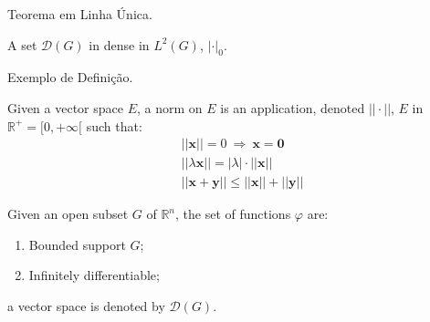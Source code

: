             Teorema em Linha Única.
            \begin{theorem}
                A set $\mathcal{D}(G)$ in dense in $L^2(G)$, $|\cdot|_0$. 
            \end{theorem}




    Exemplo de Definição.
    \begin{definition}
        Given a vector space $E$, a norm on $E$ is an application, denoted $||\cdot||$, $E$ in $\mathbb{R}^+=[0,+\infty[$ such that:
        \begin{align}
            & ||\mathbf{x}||=0\ \Rightarrow\ \mathbf{x}=\mathbf{0}\\
            & ||\lambda \mathbf{x}||=|\lambda|\cdot ||\mathbf{x}||\\
            & ||\mathbf{x}+\mathbf{y}||\leq ||\mathbf{x}||+||\mathbf{y}||
        \end{align}
    \end{definition}



    \begin{notation}
        Given an open subset $G$ of $\mathbb{R}^n$, the set of functions $\varphi$ are:
        \begin{enumerate}
            \item Bounded support $G$;
            \item Infinitely differentiable;
        \end{enumerate}
        a vector space is denoted by $\mathcal{D}(G)$. 
    \end{notation}





